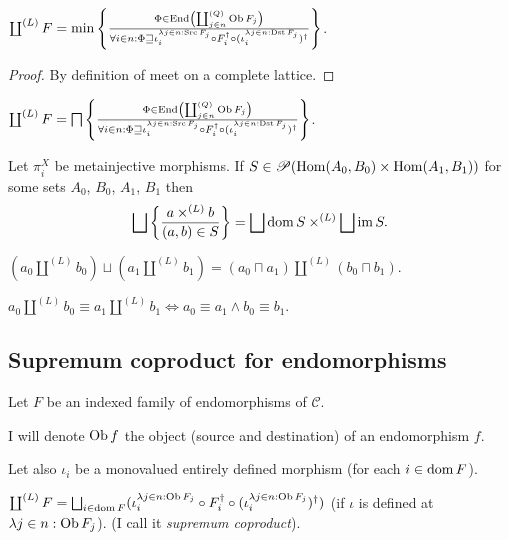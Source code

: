 \begin{prop}
  $\coprod^{(L)} F = \min \left\{ \frac{ \Phi \in \operatorname{End} \left( \coprod^{(Q)}_{j
  \in n} \operatorname{Ob} F_j \right) }{ \forall i \in n :
  \Phi \sqsupseteq \iota^{\lambda j \in n : \operatorname{Src} F_j}_i \circ
  F_i^{\dagger} \circ (\iota^{\lambda j \in n : \operatorname{Dst} F_j}_i)^{\dagger} }\right\}$.
\end{prop}

\begin{proof}
  By definition of meet on a complete lattice.
\end{proof}

\begin{cor}
  $\coprod^{(L)} F = \bigsqcap \left\{ \frac{ \Phi \in \operatorname{End} \left(
  \coprod^{(Q)}_{j \in n} \operatorname{Ob} F_j \right) }{
  \forall i \in n : \Phi \sqsupseteq \iota^{\lambda j \in n : \operatorname{Src}
  F_j}_i \circ F_i^{\dagger} \circ (\iota^{\lambda j \in n : \operatorname{Dst}
  F_j}_i)^{\dagger} }\right\}$.
\end{cor}

\begin{thm}
  Let $\pi^X_i$ be metainjective morphisms. If $S \in \mathscr{P} (\operatorname{Hom}
  (A_0 , B_0) \times \operatorname{Hom} (A_1 , B_1))$ for some sets $A_0$, $B_0$,
  $A_1$, $B_1$ then
  \[ \bigsqcup \setcond{ a \times^{(L)} b }{ (a , b)
     \in S } = \bigsqcup \dom S \times^{(L)} \bigsqcup \im
     S. \]
\end{thm}

\begin{cor}
  $(a_0 \amalg^{(L)} b_0) \sqcup (a_1 \amalg^{(L)} b_1) = (a_0 \sqcap a_1)
  \amalg^{(L)} (b_0 \sqcap b_1)$.
\end{cor}

\begin{cor}
  $a_0 \amalg^{(L)} b_0 \equiv a_1 \amalg^{(L)} b_1 \Leftrightarrow a_0 \equiv
  a_1 \wedge b_0 \equiv b_1$.
\end{cor}

\subsection{Supremum coproduct for endomorphisms}

Let $F$ be an indexed family of endomorphisms of $\mathcal{C}$.

I will denote $\operatorname{Ob} f$ the object (source and destination) of an
endomorphism $f$.

Let also $\iota_i$ be a monovalued entirely defined morphism (for each $i \in
\operatorname{dom} F$).

\begin{defn}
  $\coprod^{(L)} F = \bigsqcup_{i \in \dom F} (\iota^{\lambda j \in n :
  \Ob F_j}_i \circ F_i^{\dagger} \circ (\iota^{\lambda j \in n :
  \Ob F_j}_i)^{\dagger})$ (if $\iota$ is defined at $\lambda j \in n :
  \operatorname{Ob} F_j$). (I call it \emph{supremum coproduct}).
\end{defn}


